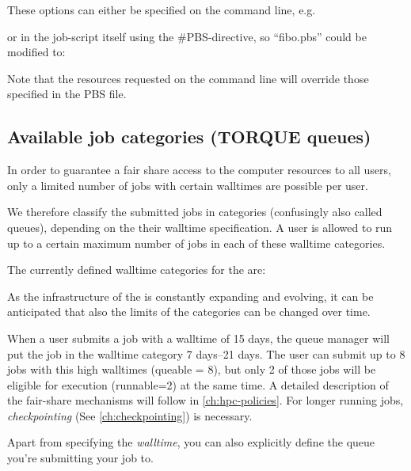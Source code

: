 These options can either be specified on the command line, e.g.

\begin{prompt}
\end{prompt}

or in the job-script itself using the \#PBS-directive, so ``fibo.pbs'' could be modified to:


Note that the resources requested on the command line will override those
specified in the PBS file.

\subsection{Available job categories (TORQUE queues)}

In order to guarantee a fair share access to the computer resources to all
users, only a limited number of jobs with certain walltimes are possible per
user.

We therefore classify the submitted jobs in categories (confusingly also called
queues), depending on the their walltime specification.  A user is allowed to
run up to a certain maximum number of jobs in each of these walltime
categories.

The currently defined walltime categories for the \hpc
are:


 As the infrastructure of the \hpc is constantly expanding
and evolving, it can be anticipated that also the limits of the categories can
be changed over time.

\ifantwerpen
When a user submits a job with a walltime of 15 days, the queue manager will
put the job in the walltime category 7 days--21 days.  The user can submit up to 8 jobs with
this high walltimes (queable = 8), but only 2 of those jobs will be eligible
for execution (runnable=2) at the same time.  A detailed description of the
fair-share mechanisms will follow in \autoref{ch:hpc-policies}. For longer running jobs,
\emph{checkpointing} (See \autoref{ch:checkpointing}) is necessary.
\fi

\iffalse
Apart from specifying the \emph{walltime}, you can also explicitly define the
queue you're submitting your job to.

